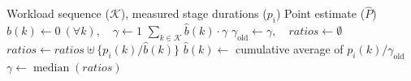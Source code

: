\begin{algorithm}[t]
\caption{Shared Point Estimation}
\label{alg:point-estimation}
\footnotesize
\renewcommand{\algorithmicrequire}{\textbf{Input:}}
\renewcommand{\algorithmicensure}{\textbf{Output:}}
\begin{algorithmic}[1]
\Require Workload sequence ($\mathcal K$), measured stage durations ($p_i$)
\Ensure Point estimate ($\hat P$)
\State $\hat b(k)\gets0\ (\forall k),\quad \gamma\gets1$ \label{alg:pe:init}
\State
{}
  \State \Return $\sum_{k\in\mathcal K}\hat b(k)\cdot\gamma$ \label{alg:pe:compute}
\EndFunction
\State
{}
  \State $\gamma_{\mathrm{old}}\gets\gamma,\quad \mathit{ratios}\gets\emptyset$ \label{alg:pe:snapshot}
   \label{alg:pe:loop}
     \label{alg:pe:observed}
      \State $\mathit{ratios}\gets\mathit{ratios}\uplus\{p_i(k)/\hat b(k)\}$ \label{alg:pe:ratio}
    \EndIf
    \State $\hat b(k)\gets$ cumulative average of $p_i(k)/\gamma_{\mathrm{old}}$ \label{alg:pe:base}
  \EndFor
   \label{alg:pe:condition}
    \State $\gamma\gets\operatorname{median}(\mathit{ratios})$ \label{alg:pe:gamma}
  \EndIf
\EndProcedure
\end{algorithmic}
\end{algorithm}
